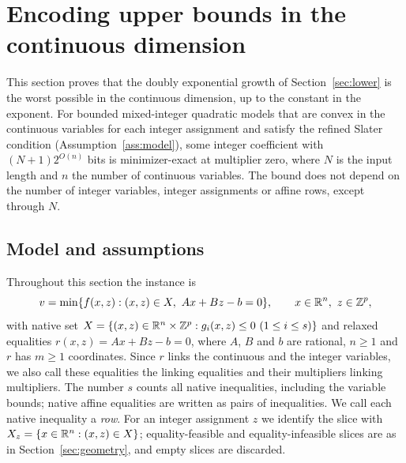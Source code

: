 \section{Encoding upper bounds in the continuous dimension}\label{sec:upper}
This section proves that the doubly exponential growth of
Section~\ref{sec:lower} is the worst possible in the continuous
dimension, up to the constant in the exponent. For bounded
mixed-integer quadratic models that are convex in the continuous
variables for each integer assignment and satisfy the refined Slater
condition (Assumption~\ref{ass:model}), some integer coefficient with
$(N+1)2^{O(n)}$ bits is minimizer-exact at multiplier zero, where $N$ is
the input length and $n$ the number of continuous variables. The bound
does not depend on the number of integer variables, integer assignments
or affine rows, except through $N$.

\subsection{Model and assumptions}
Throughout this section the instance is
\begin{equation}\label{eq:quadraticmodel}
 v=\min\{f(x,z):(x,z)\in X,\ Ax+Bz-b=0\},\qquad
 x\in\mathbb R^n,\ z\in\mathbb Z^p,
\end{equation}
with native set
$X=\{(x,z)\in\mathbb R^n\times\mathbb Z^p:g_i(x,z)\le0\ (1\le i\le s)\}$ and
relaxed equalities $r(x,z)=Ax+Bz-b=0$, where $A$, $B$ and $b$ are
rational, $n\ge1$ and $r$ has $m\ge1$ coordinates. Since $r$ links the
continuous and the integer variables, we also call these equalities the
linking equalities and their multipliers linking multipliers. The number
$s$ counts all native inequalities, including the variable bounds;
native affine equalities are written as pairs of inequalities. We call
each native inequality a \emph{row}. For an integer assignment $z$ we
identify the slice with $X_z=\{x\in\mathbb R^n:(x,z)\in X\}$; equality-feasible
and equality-infeasible slices are as in Section~\ref{sec:geometry}, and
empty slices are discarded.

